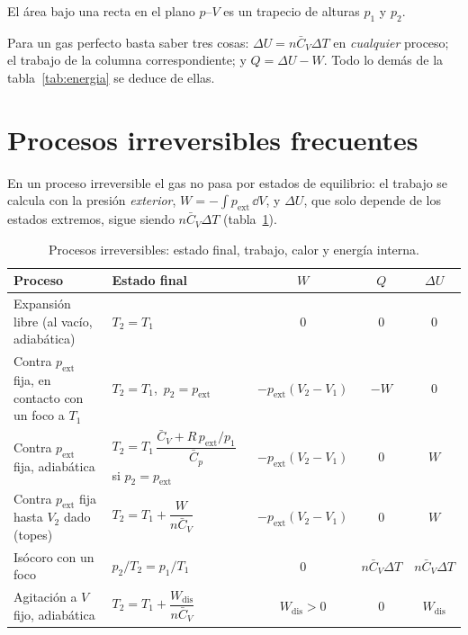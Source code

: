 \documentclass[11pt,a4paper]{article}
\newcommand{\Cv}{\bar C_V}
\newcommand{\Cp}{\bar C_p}
\begin{document}
 El área bajo una recta en el plano $p$--$V$ es un trapecio de alturas $p_1$ y $p_2$.

\begin{observacion}
Para un gas perfecto basta saber tres cosas: $\Delta U=n\Cv\Delta T$ en \emph{cualquier} proceso; el
trabajo de la columna correspondiente; y $Q=\Delta U-W$. Todo lo demás de la tabla~\ref{tab:energia} se
deduce de ellas.
\end{observacion}

\section{Procesos irreversibles frecuentes}

En un proceso irreversible el gas no pasa por estados de equilibrio: el trabajo se calcula con la presión
\emph{exterior}, $W=-\int p_{\mathrm{ext}}\,\dd V$, y $\Delta U$, que solo depende de los estados extremos,
sigue siendo $n\Cv\Delta T$ (tabla~\ref{tab:irrev}).

\begin{table}[htbp]
\centering
\caption{Procesos irreversibles: estado final, trabajo, calor y energía interna.}
\label{tab:irrev}
\small
\renewcommand{\arraystretch}{1.9}
\begin{tabularx}{\textwidth}{>{\raggedright\arraybackslash}p{3.9cm}>{\centering\arraybackslash}Xccc}
\toprule
Proceso & Estado final & $W$ & $Q$ & $\Delta U$\\
\midrule
Expansión libre (al vacío, adiabática) & $T_2=T_1$ & $0$ & $0$ & $0$\\
Contra $p_{\mathrm{ext}}$ fija, en contacto con un foco a $T_1$ & $T_2=T_1$,\ $p_2=p_{\mathrm{ext}}$ & $-p_{\mathrm{ext}}(V_2-V_1)$ & $-W$ & $0$\\
Contra $p_{\mathrm{ext}}$ fija, adiabática & $T_2=T_1\,\dfrac{\Cv+R\,p_{\mathrm{ext}}/p_1}{\Cp}$ si $p_2=p_{\mathrm{ext}}$ & $-p_{\mathrm{ext}}(V_2-V_1)$ & $0$ & $W$\\
Contra $p_{\mathrm{ext}}$ fija hasta $V_2$ dado (topes) & $T_2=T_1+\dfrac{W}{n\Cv}$ & $-p_{\mathrm{ext}}(V_2-V_1)$ & $0$ & $W$\\
Isócoro con un foco & $p_2/T_2=p_1/T_1$ & $0$ & $n\Cv\Delta T$ & $n\Cv\Delta T$\\
Agitación a $V$ fijo, adiabática & $T_2=T_1+\dfrac{W_{\mathrm{dis}}}{n\Cv}$ & $W_{\mathrm{dis}}>0$ & $0$ & $W_{\mathrm{dis}}$\\
\bottomrule
\end{tabularx}
\end{table}
\end{document}

